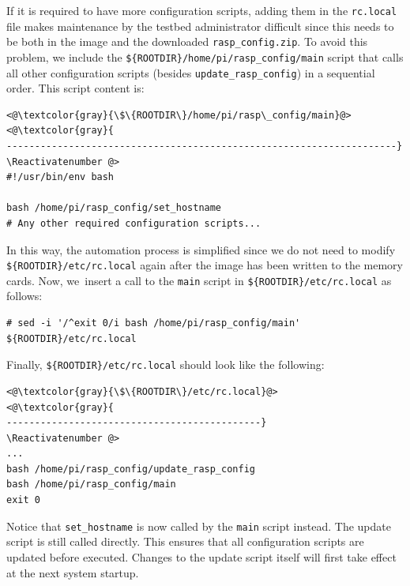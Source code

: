 \documentclass[electronics,article,accept,moreauthors,pdftex,10pt,a4paper]{mdpi}
\newcommand{\todot}[1]{%
  \textbf{\textcolor{red}{TO DO: #1}}
}
\theoremstyle{mdpi}
\newcounter{ex}
\newcounter{re}
\theoremstyle{mdpidefinition}
\begin{document}
If it is required to have more configuration scripts, adding them
in the \texttt{rc.local} file makes maintenance by the testbed administrator difficult since this needs to be both in the image and the
downloaded \texttt{rasp\_config.zip}. To avoid this problem, we include
the \texttt{\$\{ROOTDIR\}/home/pi/rasp\_config/main} script that
calls all other configuration scripts (besides \texttt{update\_rasp\_config})
in a sequential order. This script content is:

\Suppressnumber\begin{lstlisting}[]
<@\textcolor{gray}{\$\{ROOTDIR\}/home/pi/rasp\_config/main}@>
<@\textcolor{gray}{
---------------------------------------------------------------------}
\Reactivatenumber @>
#!/usr/bin/env bash

bash /home/pi/rasp_config/set_hostname
# Any other required configuration scripts...
\end{lstlisting}
\FloatBarrier
\vspace{-5mm}

In this way, the automation process is simplified since we do not need to
modify \texttt{\$\{ROOTDIR\}/etc/rc.local} again after the image has been
written to the memory cards.
Now, we~insert a call to the \texttt{main} script in \texttt{\$\{ROOTDIR\}/etc/rc.local} as follows:

\Suppressnumber\begin{lstlisting}[]
# sed -i '/^exit 0/i bash /home/pi/rasp_config/main' ${ROOTDIR}/etc/rc.local
\end{lstlisting}
\FloatBarrier
\vspace{-5mm}

Finally, \texttt{\$\{ROOTDIR\}/etc/rc.local} should look like the following:

\Suppressnumber\begin{lstlisting}[]
<@\textcolor{gray}{\$\{ROOTDIR\}/etc/rc.local}@>
<@\textcolor{gray}{
---------------------------------------------}
\Reactivatenumber @>
...
bash /home/pi/rasp_config/update_rasp_config
bash /home/pi/rasp_config/main
exit 0
\end{lstlisting}
\FloatBarrier
\vspace{-5mm}

Notice that \texttt{set\_hostname} is now called by the \texttt{main}
script instead. The update script is still called directly. This ensures that
all configuration scripts are updated before executed. Changes to the update
script itself will first take effect at the next system startup.
\end{document}
